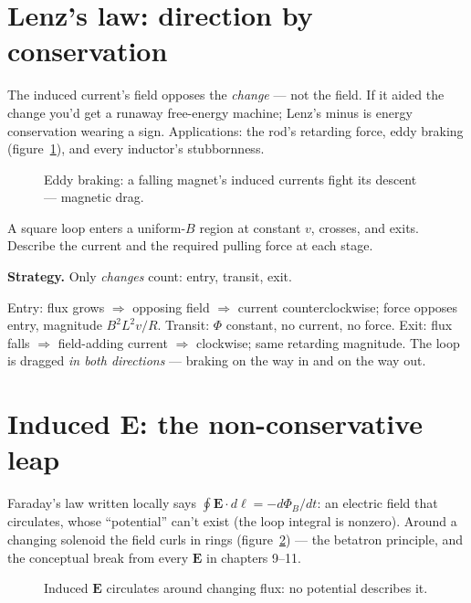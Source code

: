 \section{Lenz's law: direction by conservation}\label{sec:far-lenz}

The induced current's field opposes the \emph{change} --- not the
field. If it aided the change you'd get a runaway free-energy machine;
Lenz's minus is energy conservation wearing a sign. Applications:
the rod's retarding force, eddy braking (figure~\ref{fig:eddy}),
and every inductor's stubbornness.

\begin{figure}[htbp]\centering

\caption{Eddy braking: a falling magnet's induced currents fight its
descent --- magnetic drag.}
\label{fig:eddy}
\end{figure}

\begin{example}\label{ex:lenz}
A square loop enters a uniform-$B$ region at constant $v$, crosses,
and exits. Describe the current and the required pulling force at each
stage.
\par\smallskip
\textbf{Strategy.} Only \emph{changes} count: entry, transit, exit.
\begin{solution}
Entry: flux grows $\Rightarrow$ opposing field $\Rightarrow$ current
counterclockwise; force opposes entry, magnitude
$B^{2}L^{2}v/R$. Transit: $\Phi$ constant, no current, no force.
Exit: flux falls $\Rightarrow$ field-adding current $\Rightarrow$
clockwise; same retarding magnitude. The loop is dragged \emph{in both
directions} --- braking on the way in and on the way out. \checkmark
\end{solution}
\end{example}

\section{Induced $\mathbf E$: the non-conservative leap}\label{sec:far-e}

Faraday's law written locally says
$\oint\mathbf E\cdot d\boldsymbol\ell=-d\Phi_B/dt$: an electric field
that circulates, whose ``potential'' can't exist (the loop integral is
nonzero). Around a changing solenoid the field curls in rings
(figure~\ref{fig:sole}) --- the betatron principle, and the conceptual
break from every $\mathbf E$ in chapters 9--11.

\begin{figure}[htbp]\centering

\caption{Induced $\mathbf E$ circulates around changing flux: no
potential describes it.}
\label{fig:sole}
\end{figure}

